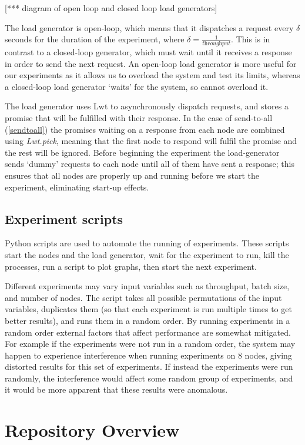 [*** diagram of open loop and closed loop load generators]

The load generator is open-loop, which means that it dispatches a request every $\delta$ seconds for the duration of the experiment, where $\delta = \frac{1}{\textit{throughput}}$. This is in contrast to a closed-loop generator, which must wait until it receives a response in order to send the next request. An open-loop load generator is more useful for our experiments as it allows us to overload the system and test its limits, whereas a closed-loop load generator `waits' for the system, so cannot overload it.

The load generator uses Lwt to asynchronously dispatch requests, and stores a promise that will be fulfilled with their response. In the case of send-to-all (\ref{sendtoall}) the promises waiting on a response from each node are combined using \textit{Lwt.pick}, meaning that the first node to respond will fulfil the promise and the rest will be ignored. Before beginning the experiment the load-generator sends `dummy' requests to each node until all of them have sent a response; this ensures that all nodes are properly up and running before we start the experiment, eliminating start-up effects.

\subsection{Experiment scripts}
Python scripts are used to automate the running of experiments. These scripts start the nodes and the load generator, wait for the experiment to run, kill the processes, run a script to plot graphs, then start the next experiment.

Different experiments may vary input variables such as throughput, batch size, and number of nodes. The script takes all possible permutations of the input variables, duplicates them (so that each experiment is run multiple times to get better results), and runs them in a random order. By running experiments in a random order external factors that affect performance are somewhat mitigated. For example if the experiments were not run in a random order, the system may happen to experience interference when running experiments on 8 nodes, giving distorted results for this set of experiments. If instead the experiments were run randomly, the interference would affect some random group of experiments, and it would be more apparent that these results were anomalous.

\section{Repository Overview}

